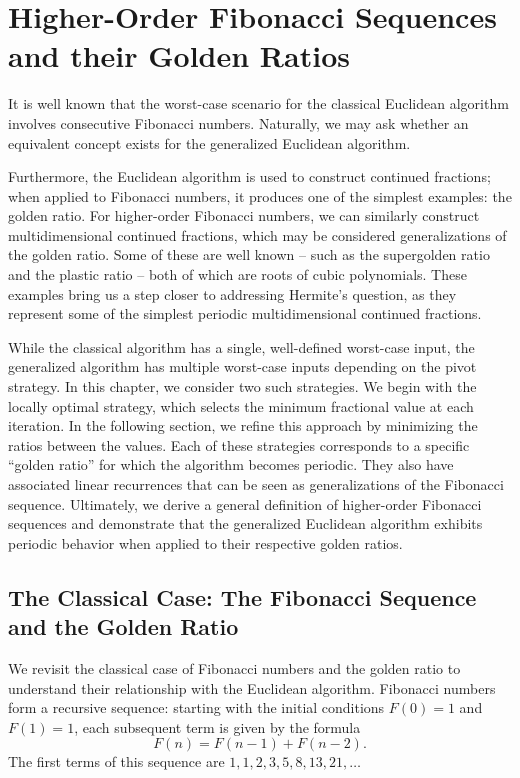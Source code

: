 \chapter{Higher-Order Fibonacci Sequences and their Golden Ratios}
\label{ch:fibonacci}

It is well known that the worst-case scenario for the classical Euclidean
algorithm involves consecutive Fibonacci numbers.
Naturally, we may ask whether an equivalent concept exists for the generalized
Euclidean algorithm.

Furthermore, the Euclidean algorithm is used to construct continued fractions;
when applied to Fibonacci numbers, it produces one of the simplest examples:
the golden ratio.
For higher-order Fibonacci numbers, we can similarly construct multidimensional
continued fractions, which may be considered generalizations of the golden
ratio.
Some of these are well known -- such as the supergolden ratio and the plastic
ratio -- both of which are roots of cubic polynomials.
These examples bring us a step closer to addressing Hermite’s question, as they
represent some of the simplest periodic multidimensional continued fractions.

While the classical algorithm has a single, well-defined worst-case input, the
generalized algorithm has multiple worst-case inputs depending on the pivot
strategy.
In this chapter, we consider two such strategies.
We begin with the locally optimal strategy, which selects the minimum
fractional value at each iteration.
In the following section, we refine this approach by minimizing the ratios
between the values.
Each of these strategies corresponds to a specific “golden ratio” for which the
algorithm becomes periodic.
They also have associated linear recurrences that can be seen as
generalizations of the Fibonacci sequence.
Ultimately, we derive a general definition of higher-order Fibonacci sequences
and demonstrate that the generalized Euclidean algorithm exhibits periodic
behavior when applied to their respective golden ratios.

\section{The Classical Case: The Fibonacci Sequence and the Golden Ratio}

We revisit the classical case of Fibonacci numbers and the golden ratio
to understand their relationship with the Euclidean algorithm.
Fibonacci numbers form a recursive sequence:
starting with the initial conditions $F(0) = 1$ and $F(1) = 1$,
each subsequent term is given by the formula
\[
  F(n) = F(n-1) + F(n-2).
\]
The first terms of this sequence are $1, 1, 2, 3, 5, 8, 13, 21, …$

